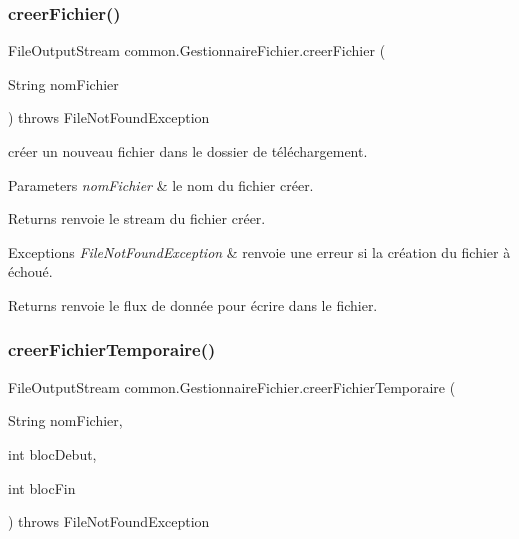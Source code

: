 \subsubsection{\texorpdfstring{creer\+Fichier()}{creerFichier()}}
{\footnotesize\ttfamily File\+Output\+Stream common.\+Gestionnaire\+Fichier.\+creer\+Fichier (\begin{DoxyParamCaption}\item[{String}]{nom\+Fichier }\end{DoxyParamCaption}) throws File\+Not\+Found\+Exception\hspace{0.3cm}{\ttfamily [inline]}}



créer un nouveau fichier dans le dossier de téléchargement. 


\begin{DoxyParams}{Parameters}
{\em nom\+Fichier} & le nom du fichier créer. \\
\hline
\end{DoxyParams}
\begin{DoxyReturn}{Returns}
renvoie le stream du fichier créer. 
\end{DoxyReturn}

\begin{DoxyExceptions}{Exceptions}
{\em File\+Not\+Found\+Exception} & renvoie une erreur si la création du fichier à échoué. \\
\hline
\end{DoxyExceptions}
\begin{DoxyReturn}{Returns}
renvoie le flux de donnée pour écrire dans le fichier. 
\end{DoxyReturn}
\mbox{\label{classcommon_1_1GestionnaireFichier_a0e950d470279008607afa8b6a525625e}} 
\subsubsection{\texorpdfstring{creer\+Fichier\+Temporaire()}{creerFichierTemporaire()}}
{\footnotesize\ttfamily File\+Output\+Stream common.\+Gestionnaire\+Fichier.\+creer\+Fichier\+Temporaire (\begin{DoxyParamCaption}\item[{String}]{nom\+Fichier,  }\item[{int}]{bloc\+Debut,  }\item[{int}]{bloc\+Fin }\end{DoxyParamCaption}) throws File\+Not\+Found\+Exception\hspace{0.3cm}{\ttfamily [inline]}}



